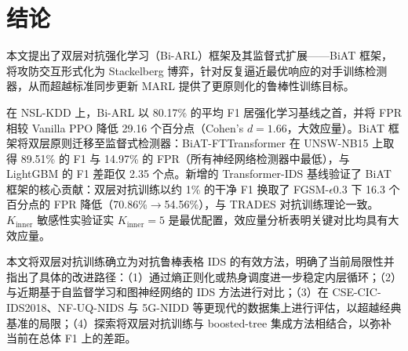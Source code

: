 \documentclass[12pt,a4paper]{ctexart}
\begin{document}
\section{结论}

本文提出了双层对抗强化学习（Bi-ARL）框架及其监督式扩展——BiAT 框架，将攻防交互形式化为 Stackelberg 博弈，针对反复逼近最优响应的对手训练检测器，从而超越标准同步更新 MARL 提供了更原则化的鲁棒性训练目标。

在 NSL-KDD 上，Bi-ARL 以 80.17\% 的平均 F1 居强化学习基线之首，并将 FPR 相较 Vanilla PPO 降低 29.16 个百分点（Cohen's $d=1.66$，大效应量）。BiAT 框架将双层原则迁移至监督式检测器：BiAT-FTTransformer 在 UNSW-NB15 上取得 89.51\% 的 F1 与 14.97\% 的 FPR（所有神经网络检测器中最低），与 LightGBM 的 F1 差距仅 2.35 个点。新增的 Transformer-IDS 基线验证了 BiAT 框架的核心贡献：双层对抗训练以约 1\% 的干净 F1 换取了 FGSM-$\epsilon$0.3 下 16.3 个百分点的 FPR 降低（70.86\%$\to$54.56\%），与 TRADES 对抗训练理论一致。$K_{\text{inner}}$ 敏感性实验证实 $K_{\text{inner}}=5$ 是最优配置，效应量分析表明关键对比均具有大效应量。

本文将双层对抗训练确立为对抗鲁棒表格 IDS 的有效方法，明确了当前局限性并指出了具体的改进路径：（1）通过熵正则化或热身调度进一步稳定内层循环；（2）与近期基于自监督学习和图神经网络的 IDS 方法进行对比；（3）在 CSE-CIC-IDS2018、NF-UQ-NIDS 与 5G-NIDD 等更现代的数据集上进行评估，以超越经典基准的局限；（4）探索将双层对抗训练与 boosted-tree 集成方法相结合，以弥补当前在总体 F1 上的差距。



\end{document}
